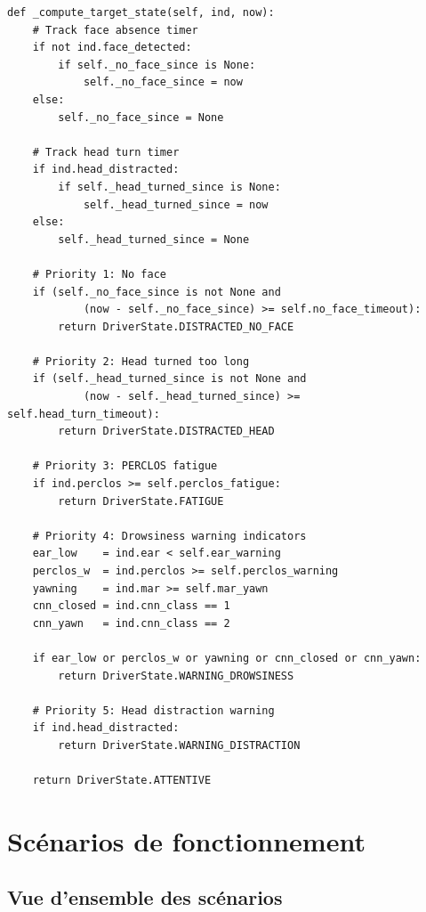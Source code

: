 \documentclass[12pt,a4paper]{report}
\begin{document}
\begin{lstlisting}[style=python, caption={M\'ethode \_compute\_target\_state (ecu\_decision.py)}, label=lst:compute_target]
def _compute_target_state(self, ind, now):
    # Track face absence timer
    if not ind.face_detected:
        if self._no_face_since is None:
            self._no_face_since = now
    else:
        self._no_face_since = None

    # Track head turn timer
    if ind.head_distracted:
        if self._head_turned_since is None:
            self._head_turned_since = now
    else:
        self._head_turned_since = None

    # Priority 1: No face
    if (self._no_face_since is not None and
            (now - self._no_face_since) >= self.no_face_timeout):
        return DriverState.DISTRACTED_NO_FACE

    # Priority 2: Head turned too long
    if (self._head_turned_since is not None and
            (now - self._head_turned_since) >= self.head_turn_timeout):
        return DriverState.DISTRACTED_HEAD

    # Priority 3: PERCLOS fatigue
    if ind.perclos >= self.perclos_fatigue:
        return DriverState.FATIGUE

    # Priority 4: Drowsiness warning indicators
    ear_low    = ind.ear < self.ear_warning
    perclos_w  = ind.perclos >= self.perclos_warning
    yawning    = ind.mar >= self.mar_yawn
    cnn_closed = ind.cnn_class == 1
    cnn_yawn   = ind.cnn_class == 2

    if ear_low or perclos_w or yawning or cnn_closed or cnn_yawn:
        return DriverState.WARNING_DROWSINESS

    # Priority 5: Head distraction warning
    if ind.head_distracted:
        return DriverState.WARNING_DISTRACTION

    return DriverState.ATTENTIVE
\end{lstlisting}

\clearpage

\chapter{Sc\'enarios de fonctionnement}

\section{Vue d'ensemble des sc\'enarios}
\end{document}

